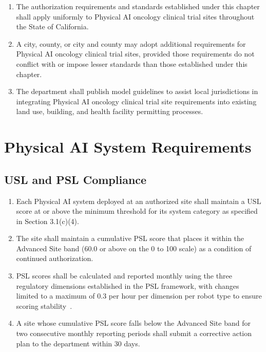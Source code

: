 \documentclass[11pt,letterpaper]{article}
\begin{document}
\begin{enumerate}[label=(\alph*)]
\item The authorization requirements and standards established under this
  chapter shall apply uniformly to Physical AI oncology clinical trial sites
  throughout the State of California.

\item A city, county, or city and county may adopt additional requirements for
  Physical AI oncology clinical trial sites, provided those requirements do not
  conflict with or impose lesser standards than those established under this
  chapter.

\item The department shall publish model guidelines to assist local
  jurisdictions in integrating Physical AI oncology clinical trial site
  requirements into existing land use, building, and health facility
  permitting processes.
\end{enumerate}

\section{Physical AI System Requirements}

\subsection{USL and PSL Compliance}

\begin{enumerate}[label=(\alph*)]
\item Each Physical AI system deployed at an authorized site shall maintain a
  USL score at or above the minimum threshold for its system category as
  specified in Section 3.1(c)(4).

\item The site shall maintain a cumulative PSL score that places it within the
  Advanced Site band (60.0 or above on the 0 to 100 scale) as a condition of
  continued authorization.

\item PSL scores shall be calculated and reported monthly using the three
  regulatory dimensions established in the PSL framework, with changes limited
  to a maximum of 0.3 per hour per dimension per robot type to ensure scoring
  stability~\cite{pslframework2026}.

\item A site whose cumulative PSL score falls below the Advanced Site band for
  two consecutive monthly reporting periods shall submit a corrective action
  plan to the department within 30 days.
\end{enumerate}
\end{document}
